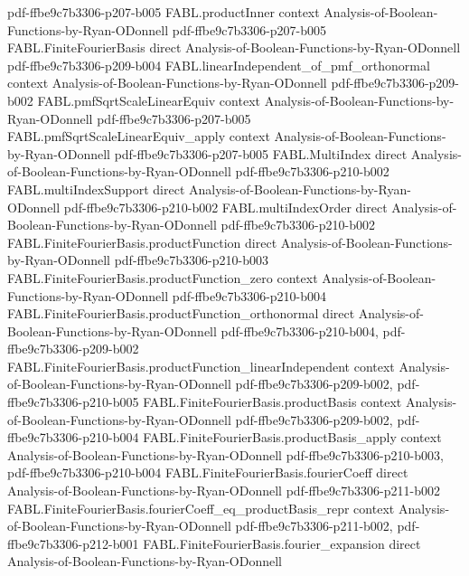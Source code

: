 \begin{theorem}
  {pdf-ffbe9c7b3306-p207-b005}
\proofstep
  {FABL.productInner}
  {context}
  {Analysis-of-Boolean-Functions-by-Ryan-ODonnell}
  {pdf-ffbe9c7b3306-p207-b005}
\proofstep
  {FABL.FiniteFourierBasis}
  {direct}
  {Analysis-of-Boolean-Functions-by-Ryan-ODonnell}
  {pdf-ffbe9c7b3306-p209-b004}
\proofstep
  {FABL.linearIndependent_of_pmf_orthonormal}
  {context}
  {Analysis-of-Boolean-Functions-by-Ryan-ODonnell}
  {pdf-ffbe9c7b3306-p209-b002}
\proofstep
  {FABL.pmfSqrtScaleLinearEquiv}
  {context}
  {Analysis-of-Boolean-Functions-by-Ryan-ODonnell}
  {pdf-ffbe9c7b3306-p207-b005}
\proofstep
  {FABL.pmfSqrtScaleLinearEquiv_apply}
  {context}
  {Analysis-of-Boolean-Functions-by-Ryan-ODonnell}
  {pdf-ffbe9c7b3306-p207-b005}
\proofstep
  {FABL.MultiIndex}
  {direct}
  {Analysis-of-Boolean-Functions-by-Ryan-ODonnell}
  {pdf-ffbe9c7b3306-p210-b002}
\proofstep
  {FABL.multiIndexSupport}
  {direct}
  {Analysis-of-Boolean-Functions-by-Ryan-ODonnell}
  {pdf-ffbe9c7b3306-p210-b002}
\proofstep
  {FABL.multiIndexOrder}
  {direct}
  {Analysis-of-Boolean-Functions-by-Ryan-ODonnell}
  {pdf-ffbe9c7b3306-p210-b002}
\proofstep
  {FABL.FiniteFourierBasis.productFunction}
  {direct}
  {Analysis-of-Boolean-Functions-by-Ryan-ODonnell}
  {pdf-ffbe9c7b3306-p210-b003}
\proofstep
  {FABL.FiniteFourierBasis.productFunction_zero}
  {context}
  {Analysis-of-Boolean-Functions-by-Ryan-ODonnell}
  {pdf-ffbe9c7b3306-p210-b004}
\proofstep
  {FABL.FiniteFourierBasis.productFunction_orthonormal}
  {direct}
  {Analysis-of-Boolean-Functions-by-Ryan-ODonnell}
  {pdf-ffbe9c7b3306-p210-b004,
    pdf-ffbe9c7b3306-p209-b002}
\proofstep
  {FABL.FiniteFourierBasis.productFunction_linearIndependent}
  {context}
  {Analysis-of-Boolean-Functions-by-Ryan-ODonnell}
  {pdf-ffbe9c7b3306-p209-b002,
    pdf-ffbe9c7b3306-p210-b005}
\proofstep
  {FABL.FiniteFourierBasis.productBasis}
  {context}
  {Analysis-of-Boolean-Functions-by-Ryan-ODonnell}
  {pdf-ffbe9c7b3306-p209-b002,
    pdf-ffbe9c7b3306-p210-b004}
\proofstep
  {FABL.FiniteFourierBasis.productBasis_apply}
  {context}
  {Analysis-of-Boolean-Functions-by-Ryan-ODonnell}
  {pdf-ffbe9c7b3306-p210-b003,
    pdf-ffbe9c7b3306-p210-b004}
\proofstep
  {FABL.FiniteFourierBasis.fourierCoeff}
  {direct}
  {Analysis-of-Boolean-Functions-by-Ryan-ODonnell}
  {pdf-ffbe9c7b3306-p211-b002}
\proofstep
  {FABL.FiniteFourierBasis.fourierCoeff_eq_productBasis_repr}
  {context}
  {Analysis-of-Boolean-Functions-by-Ryan-ODonnell}
  {pdf-ffbe9c7b3306-p211-b002,
    pdf-ffbe9c7b3306-p212-b001}
\proofstep
  {FABL.FiniteFourierBasis.fourier_expansion}
  {direct}
  {Analysis-of-Boolean-Functions-by-Ryan-ODonnell}

\end{theorem}
